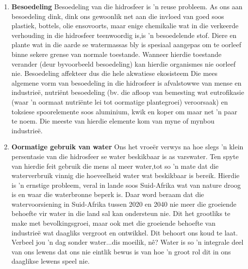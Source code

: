       \label{m38138*id342223}\begin{enumerate}[noitemsep, label=\textbf{\arabic*}. ] 
            \label{m38138*uid91}\item \textbf{Besoedeling}\newline
Besoedeling van die hidrosfeer is  'n reuse probleem. As ons aan besoedeling dink, dink ons gewoonlik net aan die invloed van goed soos plastiek, bottels, olie ensovoorts, maar enige chemikalie wat in die verkeerde verhouding in die hidrosfeer teenwoordig is,is  'n besoedelende stof. Diere en plante wat in die aarde se watermassas bly is spesiaal aangepas om te oorleef binne sekere grense van normale toestande. Wanneer hierdie toestande verander (deur byvoorbeeld besoedeling) kan hierdie organismes nie oorleef nie. Besoedeling affekteer dus die hele akwatiese ekosisteem Die mees algemene vorm van besoedeling in die hidrosfeer is afvalstowwe van mense en industrie\"{e}, nutriënt besoedeling (bv. die afloop van bemesting wat eutrofikasie (waar  'n oormaat nutriënte lei tot oormatige plantegroei) veroorsaak) en toksiese spoorelemente soos aluminium, kwik en koper om maar net  'n paar te noem. Die meeste van hierdie elemente kom van myne of mynbou industrieë.
\label{m38138*uid87}\item \textbf{Oormatige gebruik van water}\newline
Ons het vroe\"{e}r verwys na hoe slegs  'n klein persentasie van die hidrosfeer se water beskikbaar is as varswater. Ten spyte van hierdie feit gebruik die mens al meer water,tot so  'n mate dat die waterverbruik vinnig die hoeveelheid water wat beskikbaar is bereik. Hierdie is  'n ernstige probleem, veral in lande soos Suid-Afrika wat van nature droog is en waar die waterbronne beperk is. Daar word beraam dat die watervoorsiening in Suid-Afrika tussen 2020 en 2040 nie meer die groeiende behoefte vir water in die land sal kan ondersteun nie. Dit het grootliks te make met bevolkingsgroei, maar ook met die groeiende behoefte van industrieë wat daagliks vergroot en ontwikkel. Dit behoort ons koud te laat. Verbeel jou  'n dag sonder water...dis moeilik, nê? Water is so  'n integrale deel van ons lewens dat ons nie eintlik bewus is van hoe  'n groot rol dit in ons daaglikse lewens speel nie.
\end{enumerate}
\label{m38138*secfhsst!!!underscore!!!id1046}
